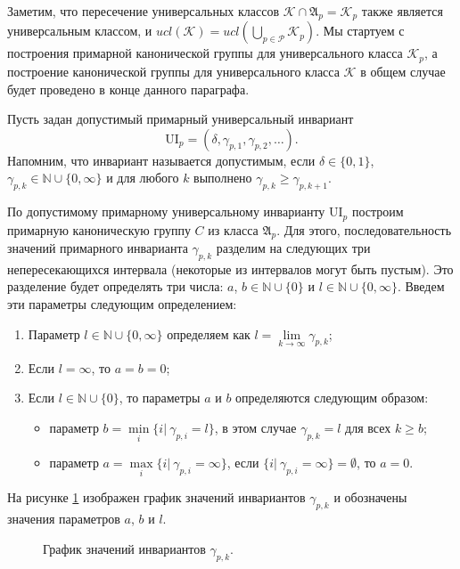 \documentclass[a4paper,11pt,twoside]{article}
\def\A{{\mathfrak{A}}}
\def\K{{\mathcal{K}}}
\def\P{{\mathcal{P}}}
\def\N{{\mathbb{N}}}
\def\ui{{\mathrm{UI}}}
\begin{document}
Заметим, что пересечение универсальных классов $\K \cap \A_p = \K_p$ также является универсальным классом, и $ucl(\K) = ucl(\bigcup\limits_{p \in \P} \K_p)$. Мы стартуем с построения примарной канонической группы для универсального класса $\K_p$, а построение канонической группы для универсального класса $\K$ в общем случае будет проведено в конце данного параграфа.

Пусть задан допустимый примарный универсальный инвариант 
$$\ui_p = (\delta, \gamma_{p,1}, \gamma_{p,2}, \ldots).$$
Напомним, что инвариант называется допустимым, если $\delta \in \{0,1\}$, $\gamma_{p,k} \in \N \cup \{0, \infty\}$ и для любого $k$ выполнено $\gamma_{p,k} \geq \gamma_{p, k+1}$.

По допустимому примарному универсальному инварианту $\ui_p$ построим примарную каноническую группу $C$ из класса $\A_p$. Для этого, последовательность значений примарного инварианта $\gamma_{p,k}$ разделим на следующих три непересекающихся интервала (некоторые из интервалов могут быть пустым). Это разделение будет определять три числа: $a$, $b \in \N \cup \{0\}$ и $l \in \N \cup \{0, \infty\}$. Введем эти параметры следующим определением:
\begin{enumerate}
\item Параметр $l \in \N \cup \{0, \infty\}$ определяем как $l = \lim\limits_{k \rightarrow \infty} \gamma_{p,k}$;
\item Если $l = \infty$, то $a = b = 0$;
\item Если $l \in \N \cup \{0\}$, то параметры $a$ и $b$ определяются следующим образом:
\begin{itemize}
\item параметр $b = \min\limits_{i} \{ i | \ \gamma_{p,i} = l\}$, в этом случае $\gamma_{p,k} = l$ для всех $k \geq b$;
\item параметр $a = \max\limits_{i} \{i | \ \gamma_{p,i} = \infty\}$, если $\{i | \ \gamma_{p,i} = \infty\} = \emptyset$, то $a = 0$.
\end{itemize}
\end{enumerate}

На рисунке \ref{pic:GammaPK} изображен график значений инвариантов $\gamma_{p,k}$ и обозначены значения параметров $a$, $b$ и $l$.

\begin{figure}[h!]
\centering
{}
\caption{График значений инвариантов $\gamma_{p,k}.$}\label{pic:GammaPK}
\end{figure}
\end{document}
